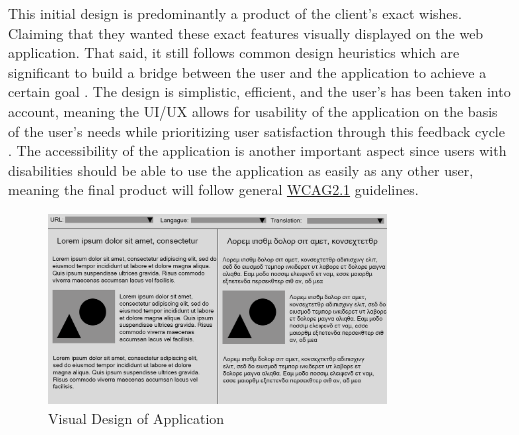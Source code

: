 \indent This initial design is predominantly a product of the client's exact wishes. Claiming that they wanted these exact features visually displayed on the web application. That said, it still follows common design heuristics which are significant to build a bridge between the user and the application to achieve a certain goal \cite{DesignHeuristic}. The design is simplistic, efficient, and the user's has been taken into account, meaning the UI/UX allows for usability of the application on the basis of the user's needs while prioritizing user satisfaction through this feedback cycle \cite{DesignHeuristic}. The accessibility of the application is another important aspect since users with disabilities should be able to use the application as easily as any other user, meaning the final product will follow general \href{https://www.w3.org/TR/WCAG21/}{WCAG2.1} guidelines. 

\begin{figure}[ht]
    \centering
    \includegraphics[width=0.8\textwidth]{images/AWS_Blog_translate_rough_sketch.png}
    \caption{Visual Design of Application}
    \label{fig:rough_sketch}
\end{figure}
